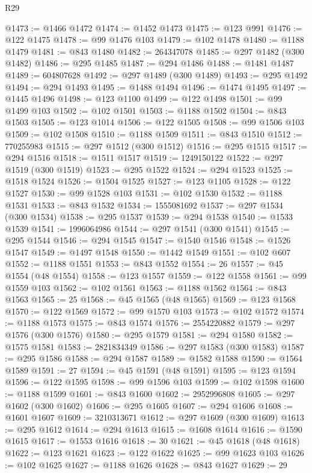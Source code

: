 \begin{lexlean}{R29}
\begin{coremodule}
@1473 := @1466 @1472
@1474 := @1452 @1473
@1475 := @123 @991
@1476 := @122 @1475
@1478 := @99 @1476 @103
@1479 := @102 @1478
@1480 := @1188 @1479
@1481 := @843 @1480
@1482 := 264347078
@1485 := @297 @1482 (@300 @1482)
@1486 := @295 @1485
@1487 := @294 @1486
@1488 := @1481 @1487
@1489 := 604807628
@1492 := @297 @1489 (@300 @1489)
@1493 := @295 @1492
@1494 := @294 @1493
@1495 := @1488 @1494
@1496 := @1474 @1495
@1497 := @1445 @1496
@1498 := @123 @1100
@1499 := @122 @1498
@1501 := @99 @1499 @103
@1502 := @102 @1501
@1503 := @1188 @1502
@1504 := @843 @1503
@1505 := @123 @1014
@1506 := @122 @1505
@1508 := @99 @1506 @103
@1509 := @102 @1508
@1510 := @1188 @1509
@1511 := @843 @1510
@1512 := 770255983
@1515 := @297 @1512 (@300 @1512)
@1516 := @295 @1515
@1517 := @294 @1516
@1518 := @1511 @1517
@1519 := 1249150122
@1522 := @297 @1519 (@300 @1519)
@1523 := @295 @1522
@1524 := @294 @1523
@1525 := @1518 @1524
@1526 := @1504 @1525
@1527 := @123 @1105
@1528 := @122 @1527
@1530 := @99 @1528 @103
@1531 := @102 @1530
@1532 := @1188 @1531
@1533 := @843 @1532
@1534 := 1555081692
@1537 := @297 @1534 (@300 @1534)
@1538 := @295 @1537
@1539 := @294 @1538
@1540 := @1533 @1539
@1541 := 1996064986
@1544 := @297 @1541 (@300 @1541)
@1545 := @295 @1544
@1546 := @294 @1545
@1547 := @1540 @1546
@1548 := @1526 @1547
@1549 := @1497 @1548
@1550 := @1442 @1549
@1551 := @102 @607
@1552 := @1188 @1551
@1553 := @843 @1552
@1554 := 26
@1557 := @45 @1554 (@48 @1554)
@1558 := @123 @1557
@1559 := @122 @1558
@1561 := @99 @1559 @103
@1562 := @102 @1561
@1563 := @1188 @1562
@1564 := @843 @1563
@1565 := 25
@1568 := @45 @1565 (@48 @1565)
@1569 := @123 @1568
@1570 := @122 @1569
@1572 := @99 @1570 @103
@1573 := @102 @1572
@1574 := @1188 @1573
@1575 := @843 @1574
@1576 := 2554220882
@1579 := @297 @1576 (@300 @1576)
@1580 := @295 @1579
@1581 := @294 @1580
@1582 := @1575 @1581
@1583 := 2821834349
@1586 := @297 @1583 (@300 @1583)
@1587 := @295 @1586
@1588 := @294 @1587
@1589 := @1582 @1588
@1590 := @1564 @1589
@1591 := 27
@1594 := @45 @1591 (@48 @1591)
@1595 := @123 @1594
@1596 := @122 @1595
@1598 := @99 @1596 @103
@1599 := @102 @1598
@1600 := @1188 @1599
@1601 := @843 @1600
@1602 := 2952996808
@1605 := @297 @1602 (@300 @1602)
@1606 := @295 @1605
@1607 := @294 @1606
@1608 := @1601 @1607
@1609 := 3210313671
@1612 := @297 @1609 (@300 @1609)
@1613 := @295 @1612
@1614 := @294 @1613
@1615 := @1608 @1614
@1616 := @1590 @1615
@1617 := @1553 @1616
@1618 := 30
@1621 := @45 @1618 (@48 @1618)
@1622 := @123 @1621
@1623 := @122 @1622
@1625 := @99 @1623 @103
@1626 := @102 @1625
@1627 := @1188 @1626
@1628 := @843 @1627
@1629 := 29

\end{coremodule}
\end{lexlean}
